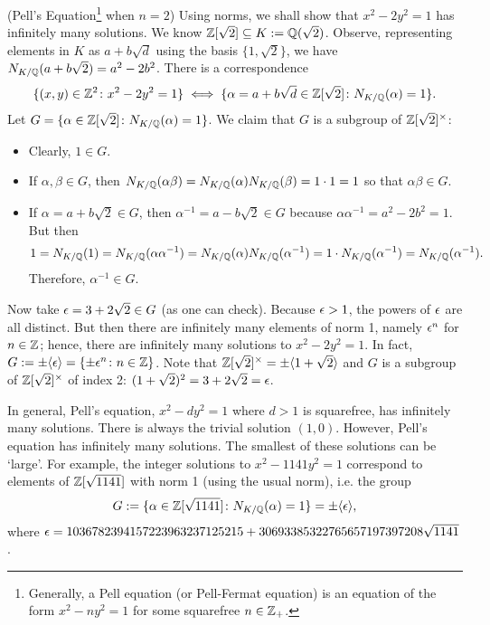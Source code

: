 \begin{ex}(Pell's Equation\footnote{Generally, a Pell equation (or Pell-Fermat equation) is an equation of the form $x^2 - ny^2 = 1$ for some squarefree $n \in \mathbb{Z}_+$.} when $n= 2$) \label{ex:pell2}
Using norms, we shall show that $x^2-2y^2=1$ has infinitely many solutions. We know $\mathbb{Z}[\sqrt{2}] \subseteq K:= \mathbb{Q}(\sqrt{2})$. Observe, representing elements in $K$ as $a + b \sqrt{d}$ using the basis $\{ 1, \sqrt{2} \}$, we have $N_{K/\mathbb{Q}}(a + b\sqrt{2})= a^2 - 2b^2$. There is a correspondence
	\[
	\{ (x,y) \in \mathbb{Z}^2 \colon x^2 - 2y^2=1 \} \iff \{ \alpha= a + b\sqrt{d} \in \mathbb{Z}[\sqrt{2}] \colon N_{K/\mathbb{Q}}(\alpha)= 1 \}.
	\] 
Let $G= \{ \alpha \in \mathbb{Z}[\sqrt{2}] \colon N_{K/\mathbb{Q}}(\alpha)= 1 \}$. We claim that $G$ is a subgroup of $\mathbb{Z}[\sqrt{2}]^\times$:
	\begin{itemize}
	\item Clearly, $1 \in G$.
	\item If $\alpha, \beta \in G$, then $N_{K/\mathbb{Q}}(\alpha\beta)= N_{K/\mathbb{Q}}(\alpha) N_{K/\mathbb{Q}}(\beta)= 1 \cdot 1= 1$ so that $\alpha\beta \in G$.
	\item If $\alpha= a + b\sqrt{2} \in G$, then $\alpha^{-1}= a - b\sqrt{2} \in G$ because $\alpha \alpha^{-1}= a^2 - 2b^2= 1$. But then 
		\[
		1= N_{K/\mathbb{Q}}(1)= N_{K/\mathbb{Q}}(\alpha \alpha^{-1})= N_{K/\mathbb{Q}}(\alpha) N_{K/\mathbb{Q}}(\alpha^{-1})= 1 \cdot N_{K/\mathbb{Q}}(\alpha^{-1})= N_{K/\mathbb{Q}}(\alpha^{-1}).
		\]
	Therefore, $\alpha^{-1} \in G$. 
	\end{itemize}
Now take $\epsilon= 3 + 2\sqrt{2} \in G$ (as one can check). Because $\epsilon>1$, the powers of $\epsilon$ are all distinct. But then there are infinitely many elements of norm 1, namely $\epsilon^n$ for $n \in \mathbb{Z}$; hence, there are infinitely many solutions to $x^2-2y^2=1$. In fact, $G:= \pm \langle \epsilon \rangle= \{ \pm \epsilon^n \colon n \in \mathbb{Z} \}$. Note that $\mathbb{Z}[\sqrt{2}]^\times= \pm \langle 1+\sqrt{2}\rangle$ and $G$ is a subgroup of $\mathbb{Z}[\sqrt{2}]^\times$ of index 2: $(1 + \sqrt{2})^2= 3 + 2\sqrt{2}= \epsilon$. \xqed \pskip
\end{ex}


\begin{ex} \label{ex:pellgen}
In general, Pell's equation, $x^2 - dy^2= 1$ where $d>1$ is squarefree, has infinitely many solutions. There is always the trivial solution $(1,0)$. However, Pell's equation has infinitely many solutions. The smallest of these solutions can be `large'. For example, the integer solutions to $x^2 - 1141y^2= 1$ correspond to elements of $\mathbb{Z}[\sqrt{1141}]$ with norm 1 (using the usual norm), i.e. the group
	\[
	G:= \{ \alpha \in \mathbb{Z}[\sqrt{1141}] \colon N_{K/\mathbb{Q}}(\alpha)= 1 \}= \pm \langle \epsilon \rangle,
	\]
where $\epsilon= 1036782394157223963237125215 + 30693385322765657197397208\sqrt{1141}$. \xqed \pskip
\end{ex}



